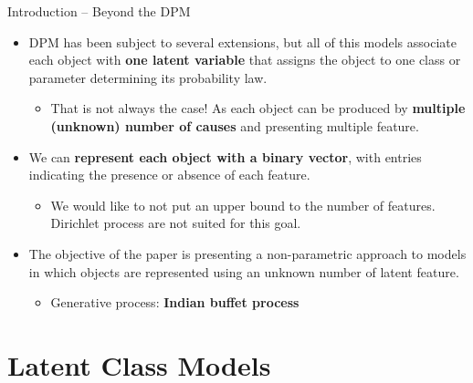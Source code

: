 \documentclass[aspectratio=169,xcolor=dvipsnames]{beamer}
\begin{document}
\begin{frame}{Introduction – Beyond the DPM}
\setlength{\leftmargini}{0.2cm}
\begin{itemize}
    \item DPM has been subject to several extensions, but all of this models associate each object with \textbf{one latent variable} that assigns the object to one class or parameter determining its probability law.
    \begin{itemize}
        \item That is not always the case! As each object can be produced by \textbf{multiple (unknown) number of causes} and presenting multiple feature.
    \end{itemize}
    \item We can \textbf{represent each object with a binary vector}, with entries indicating the presence or absence of each feature.
    \begin{itemize}
        \item We would like to not put an upper bound to the number of features. Dirichlet process are not suited for this goal.
    \end{itemize}
    \item The objective of the paper is presenting a non-parametric approach to models in which objects are represented using an unknown number of latent feature.
    \begin{itemize}
        \item Generative process: \textbf{Indian buffet process}
    \end{itemize}
\end{itemize}
\end{frame}

\section{Latent Class Models} 
\end{document}
